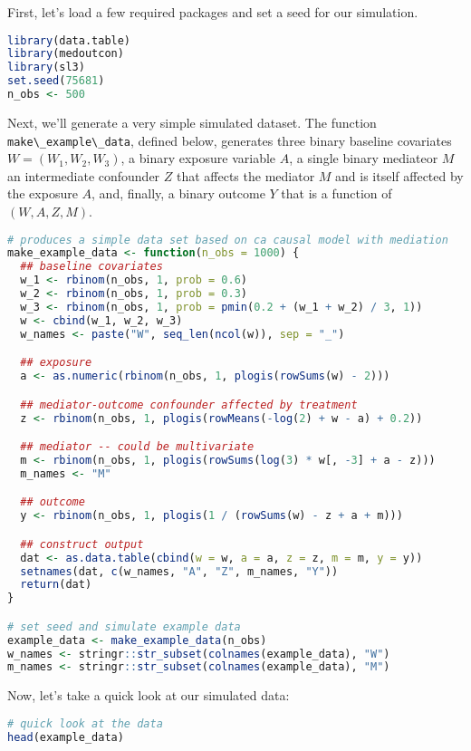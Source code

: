 \documentclass[
  12pt,
]{book}
\newcommand{\passthrough}[1]{#1}
\theoremstyle{definition}
\theoremstyle{definition}
\theoremstyle{definition}
\newcommand{\1}{\mathbbm{1}}
\begin{document}
First, let's load a few required packages and set a seed for our simulation.

\begin{lstlisting}[language=R]
library(data.table)
library(medoutcon)
library(sl3)
set.seed(75681)
n_obs <- 500
\end{lstlisting}

Next, we'll generate a very simple simulated dataset. The function
\passthrough{\lstinline!make\_example\_data!}, defined below, generates three binary baseline covariates
\(W = (W_1, W_2, W_3)\), a binary exposure variable \(A\), a single binary mediateor
\(M\) an intermediate confounder \(Z\) that affects the mediator \(M\) and is itself
affected by the exposure \(A\), and, finally, a binary outcome \(Y\) that is a
function of \((W, A, Z, M)\).

\begin{lstlisting}[language=R]
# produces a simple data set based on ca causal model with mediation
make_example_data <- function(n_obs = 1000) {
  ## baseline covariates
  w_1 <- rbinom(n_obs, 1, prob = 0.6)
  w_2 <- rbinom(n_obs, 1, prob = 0.3)
  w_3 <- rbinom(n_obs, 1, prob = pmin(0.2 + (w_1 + w_2) / 3, 1))
  w <- cbind(w_1, w_2, w_3)
  w_names <- paste("W", seq_len(ncol(w)), sep = "_")

  ## exposure
  a <- as.numeric(rbinom(n_obs, 1, plogis(rowSums(w) - 2)))

  ## mediator-outcome confounder affected by treatment
  z <- rbinom(n_obs, 1, plogis(rowMeans(-log(2) + w - a) + 0.2))

  ## mediator -- could be multivariate
  m <- rbinom(n_obs, 1, plogis(rowSums(log(3) * w[, -3] + a - z)))
  m_names <- "M"

  ## outcome
  y <- rbinom(n_obs, 1, plogis(1 / (rowSums(w) - z + a + m)))

  ## construct output
  dat <- as.data.table(cbind(w = w, a = a, z = z, m = m, y = y))
  setnames(dat, c(w_names, "A", "Z", m_names, "Y"))
  return(dat)
}

# set seed and simulate example data
example_data <- make_example_data(n_obs)
w_names <- stringr::str_subset(colnames(example_data), "W")
m_names <- stringr::str_subset(colnames(example_data), "M")
\end{lstlisting}

Now, let's take a quick look at our simulated data:

\begin{lstlisting}[language=R]
# quick look at the data
head(example_data)
\end{lstlisting}
\end{document}
